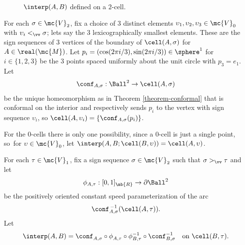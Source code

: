 \begin{figure}[htb]
\begin{center}
\end{center}

\caption{$\interp(A,B)$ defined on a $2$-cell.}
\label{figure-interp}

\end{figure}

For each $\sigma \in \mc{V}_{2}$, fix a choice of $3$ distinct elements $\upsilon_1,\upsilon_2,\upsilon_3 \in \mc{V}_{0}$ with $\upsilon_i <_\vv \sigma$; lets say the $3$ lexicographically smallest elements. These are the sign sequences of $3$ vertices of the boundary of $\cell(A,\sigma)$ for $A \in \real(\mc{M})$.
Let $p_i = (\cos (2\pi i/3), \sin (2\pi i/3)) \in \sphere^1$ for $i \in \{1,2,3\}$ be the $3$ points spaced uniformly about the unit circle with $p_3 = e_1$.
Let
\[ \conf_{A,\sigma}: \Ball^2 \to \cell(A,\sigma) \]
be the unique homeomorphism as in Theorem \ref{theorem-conformal} that is conformal on the interior and respectively sends $p_i$ to the vertex with sign sequence $\upsilon_i$, so $\cell(A,\upsilon_i) = \{\conf_{A,\sigma}(p_i)\}$.

For the 0-cells there is only one possibility, since a 0-cell is just a single point, so~for $\upsilon \in \mc{V}_{0}$,
let $\interp(A,B;\cell(B,\upsilon)) = \cell(A,\upsilon)$.

For each $\tau \in \mc{V}_{1}$, fix a sign sequence $\sigma \in \mc{V}_{2}$ such that $\sigma >_\vv \tau$ and let\vspace*{-3pt}
\[\phi_{A,\tau} : [0,1]_\mb{R} \to \partial{}\Ball^2\] be the positively oriented constant speed parameterization of the arc\vspace*{-3pt}
\[
\conf_{A,\sigma}^{\,-1}(\cell(A,\tau)).
\]
Let\vspace*{-5pt}
\[ \interp(A,B) = \conf_{A,\sigma}^{\phantom1} \circ \phi_{A,\tau}^{\phantom1} \circ \phi_{B,\tau}^{-1} \circ \conf_{B,\sigma}^{-1} \quad
\text{on } \cell(B,\tau).\]

